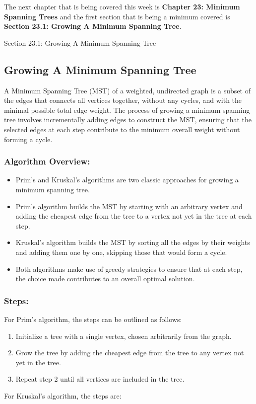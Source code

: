 The next chapter that is being covered this week is \textbf{Chapter 23: Minimum Spanning Trees} and the first section that is being a minimum covered is \textbf{Section 23.1: Growing A Minimum Spanning Tree}.

\begin{notes}{Section 23.1: Growing A Minimum Spanning Tree}
    \subsection*{Growing A Minimum Spanning Tree}

    A Minimum Spanning Tree (MST) of a weighted, undirected graph is a subset of the edges that connects all vertices together, without any cycles, and with the minimal possible total edge weight. The 
    process of growing a minimum spanning tree involves incrementally adding edges to construct the MST, ensuring that the selected edges at each step contribute to the minimum overall weight without 
    forming a cycle. \vspace*{1em}
    
    \subsubsection*{Algorithm Overview:}

    \begin{itemize}
        \item Prim's and Kruskal's algorithms are two classic approaches for growing a minimum spanning tree.
        \item Prim's algorithm builds the MST by starting with an arbitrary vertex and adding the cheapest edge from the tree to a vertex not yet in the tree at each step.
        \item Kruskal's algorithm builds the MST by sorting all the edges by their weights and adding them one by one, skipping those that would form a cycle.
        \item Both algorithms make use of greedy strategies to ensure that at each step, the choice made contributes to an overall optimal solution.
    \end{itemize}
    
    \subsubsection*{Steps:}

    For Prim's algorithm, the steps can be outlined as follows:
    \begin{enumerate}
        \item Initialize a tree with a single vertex, chosen arbitrarily from the graph.
        \item Grow the tree by adding the cheapest edge from the tree to any vertex not yet in the tree.
        \item Repeat step 2 until all vertices are included in the tree.
    \end{enumerate}
    For Kruskal's algorithm, the steps are:


\end{notes}
